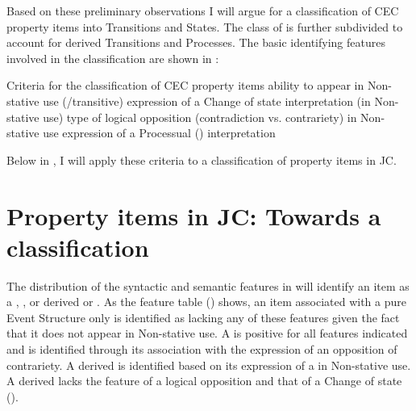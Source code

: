 Based on these preliminary observations I will argue for a classification of CEC property items into Transitions and States. The class of  is further subdivided to account for derived Transitions and Processes. The basic identifying features involved in the classification are shown in : 

\ea%
\label{ex:5:6}
Criteria for the classification of CEC property items
\ea ability to appear in Non-stative use (\slash transitive)
\ex expression of a Change of state interpretation (in Non-stative use)
\ex type of logical opposition (contradiction vs. contrariety) in Non-stative use
\ex expression of a Processual () interpretation
\z
\z 

\noindent Below in , I will apply these criteria to a classification of property items in JC.\largerpage[-3]


\section{Property items in JC: Towards a classification}\label{sec:5.2}

The distribution of the syntactic and semantic features in  will identify an item as a , , or derived  or . As the feature table () shows, an item associated with a pure  Event Structure only is identified as lacking any of these features given the fact that it does not appear in Non-stative use. A  is positive for all features indicated and is identified through its association with the expression of an opposition of contrariety. A derived  is identified based on its expression of a  in Non-stative use. A derived  lacks the feature of a logical opposition and that of a Change of state ().

